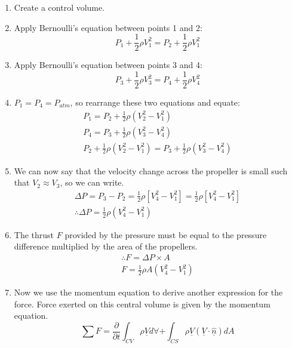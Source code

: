 \begin{enumerate}[noitemsep]
  \item Create a control volume.
  \item Apply Bernoulli's equation between points 1 and 2:
        \begin{equation}
          P_1 + \frac{1}{2} \rho V_1^2 = P_2 + \frac{1}{2} \rho V_1^2
        \end{equation}
  \item Apply Bernoulli's equation between points 3 and 4:
        \begin{equation}
          P_3 + \frac{1}{2} \rho V_3^2 = P_4 + \frac{1}{2} \rho V_4^2
        \end{equation}
  \item $P_1 = P_4 = P_{atm}$, so rearrange these two equations and equate:
        \begin{gather}
          P_1 = P_2 + \frac{1}{2}\rho (V_2^2 - V_1^2)\\
          P_4 = P_3 + \frac{1}{2}\rho (V_3^2 - V_4^2)\\
          P_2 + \frac{1}{2}\rho (V_2^2 - V_1^2) = P_3 + \frac{1}{2}\rho (V_3^2 - V_4^2)
        \end{gather}
  \item We can now say that the velocity change across the propeller is small such that $V_2 \approx V_3$, so we can write.
        \begin{gather}
          \Delta P = P_3 - P_2 = \frac{1}{2} \rho [ V_4^2 - V_1^2] = \frac{1}{2} \rho [V_4^2 - V_1^2]\\
          \therefore \Delta P = \frac{1}{2} \rho (V_4^2 - V_1^2)
        \end{gather}
  \item The thrust $F$ provided by the pressure must be equal to the pressure difference multiplied by the area of the propellers.
        \begin{gather}
          \therefore F = \Delta P \times A\\
          F = \frac{1}{2} \rho A (V_4^2 - V_1^2) \label{thrustprop}
        \end{gather}
  \item Now we use the momentum equation to derive another expression for the force. Force exerted on this central volume is given by the momentum equation.
        \begin{equation}
          \sum F = \frac{\partial}{\partial t} \int_{CV} \rho \underline{V} d \forall + \int_{CS} \rho \underline{V} (\underline{V} \cdot \underline{\hat{n}}) dA

\end{equation}
\end{enumerate}
